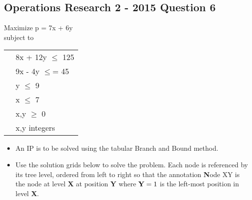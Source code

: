 \documentclass[french]{article}
\begin{document}
\subsection*{Operations Research 2 - 2015 Question 6}
Maximize p = 7x + 6y \\
	
	subject to
	
	\begin{tabular}{cl}
		
		\phantom{space}
		& 8x + 12y $\leq$ 125\\
		& 9x - 4y $\leq$= 45\\
		& y $\leq$ 9\\
		& x $\leq$ 7\\
		& x,y $\geq$ 0\\
		& x,y integers\\
		
	\end{tabular} 
	
\begin{itemize}
	\item An IP is to be solved using the tabular Branch and Bound method.
	
	
\item 	Use the solution grids below to solve the problem. Each node is referenced by its tree level, ordered from left to right so that the annotation {\textbf Node XY} is the node at level {\textbf X} at position {\textbf Y} where ${\textbf Y}=1$ is the left-most position in level {\textbf X}.
\end{itemize}	
\end{document}
